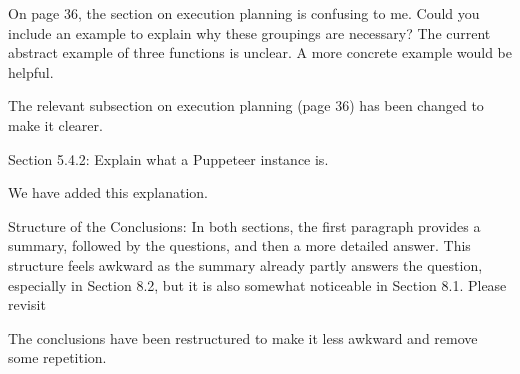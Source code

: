 \documentclass[
    paper=a4,
    paper=portrait,
    parskip=half,
]{scrartcl}
\newenvironment{point}{%
    \itshape%
  }{%
    \nopagebreak%
}
\newenvironment{reply}{}{%
    \vspace{0.8cm}
}
\begin{document}
\begin{point}
    On page 36, the section on execution planning is confusing to me.
    Could you include an example to explain why these groupings are necessary?
    The current abstract example of three functions is unclear.
    A more concrete example would be helpful.
\end{point}

\begin{reply}
    The relevant subsection on execution planning (page 36) has been changed to make it clearer.
\end{reply}

\begin{point}
    Section 5.4.2: Explain what a Puppeteer instance is.
\end{point}

\begin{reply}
    We have added this explanation.
\end{reply}

\begin{point}
    Structure of the Conclusions: In both sections, the first paragraph provides a summary, followed by the questions, and then a more detailed answer.
    This structure feels awkward as the summary already partly answers the question, especially in Section 8.2, but it is also somewhat noticeable in Section 8.1. Please revisit
\end{point}

\begin{reply}
    The conclusions have been restructured to make it less awkward and remove some repetition.
\end{reply}
\end{document}
